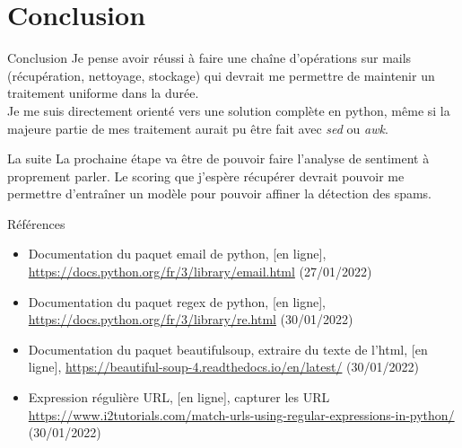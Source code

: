 \documentclass[xelatex,11pt, xcolor=dvipsnames]{beamer}
\begin{document}
\section{Conclusion}
  \begin{frame}
  \begin{block}{Conclusion}
  Je pense avoir réussi à faire une chaîne d'opérations sur mails (récupération, nettoyage, stockage) qui devrait me permettre de maintenir un traitement uniforme dans la durée.\\
  
  Je me suis directement orienté vers une solution complète en python, même si la majeure partie de mes traitement aurait pu être fait avec \emph{sed} ou \emph{awk}.
  \end{block}
  \begin{block}{La suite}
  La prochaine étape va être de pouvoir faire l'analyse de sentiment à proprement parler.
  Le scoring que j'espère récupérer devrait pouvoir me permettre d’entraîner un modèle pour pouvoir affiner la détection des spams.
  \end{block}
  \end{frame}

\appendix

  \begin{frame}{Références}%
  \renewcommand*{\bibfont}{\footnotesize}
  \nocite{*}
  \printbibliography[heading=none]
  \begin{itemize}
  	\item Documentation du paquet email de python, [en ligne], \url{https://docs.python.org/fr/3/library/email.html} (27/01/2022)
  	\item Documentation du paquet regex de python, [en ligne], \url{https://docs.python.org/fr/3/library/re.html} (30/01/2022)
  	\item Documentation du paquet beautifulsoup, extraire du texte de l'html, [en ligne], \url{https://beautiful-soup-4.readthedocs.io/en/latest/} (30/01/2022)
  	\item Expression régulière URL, [en ligne], capturer les URL \url{https://www.i2tutorials.com/match-urls-using-regular-expressions-in-python/} (30/01/2022)
  \end{itemize}
\end{frame}
\end{document}
